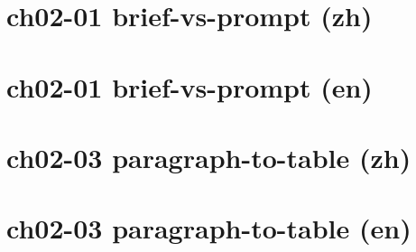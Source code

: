 \documentclass[UTF8,fontset=fandol,11pt]{ctexart}
\begin{document}
\section*{ch02-01 brief-vs-prompt (zh)}

\newpage

\section*{ch02-01 brief-vs-prompt (en)}

\newpage

\section*{ch02-03 paragraph-to-table (zh)}
\begin{table}[htbp]
\centering

\end{table}
\newpage

\section*{ch02-03 paragraph-to-table (en)}
\begin{table}[htbp]
\centering

\end{table}
\end{document}
